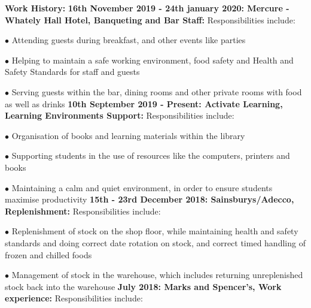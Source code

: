 \documentclass[10pt,a4paper]{book}
\begin{document}
\begin{flushleft}
  \textbf {Work History:}
  \linebreak{}
  \linebreak{}
  \textbf {16th November 2019 - 24th january 2020: Mercure - Whately Hall Hotel, Banqueting and Bar Staff:}
  \linebreak{}
  Responsibilities include:

\item[$\bullet$] Attending guests during breakfast, and other events like parties

\item[$\bullet$] Helping to maintain a safe working environment, food safety and Health and Safety Standards for staff and guests

\item[$\bullet$] Serving guests within the bar, dining rooms and other private rooms with food as well as drinks
  \linebreak{}
  \linebreak{}
  \textbf {10th September 2019 - Present: Activate Learning, Learning Environments Support:}
  \linebreak{}
  Responsibilities include:

\item[$\bullet$] Organisation of books and learning materials within the library

\item[$\bullet$] Supporting students in the use of resources like the computers, printers and books

\item[$\bullet$] Maintaining a calm and quiet environment, in order to ensure students maximise productivity
  \linebreak{}
  \linebreak{}
\textbf {15th - 23rd December 2018: Sainsburys/Adecco, Replenishment:}
  \linebreak{}
  Responsibilities include:

\item[$\bullet$] Replenishment of stock on the shop floor, while maintaining health and safety standards and doing correct date rotation on stock, and correct timed handling of frozen and chilled foods

\item[$\bullet$] Management of stock in the warehouse, which includes returning unreplenished stock back into the warehouse
  \linebreak{}
  \linebreak{}
\textbf {July 2018: Marks and Spencer's, Work experience:}
  \linebreak{}
Responsibilities include:


\end{flushleft}
\end{document}
